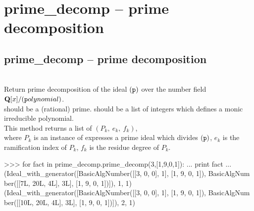 

 \section{prime\_decomp -- prime decomposition}
%
  \subsection{prime\_decomp -- prime decomposition}
   \\
   \spacing
   \quad Return prime decomposition of the ideal $({\texttt p})$ over the number field $\mathbf{Q}[x]/({\texttt polynomial})$.\\
   \spacing
   \quad {} should be a (rational) prime. 
    should be a list of integers which defines a monic irreducible polynomial.\\
   This method returns a list of $(P_k,\ e_k,\ f_k)$,\\ 
    where $P_k$ is an instance of  expresses a prime ideal which divides $({\texttt p})$, 
          $e_k$ is the ramification index of $P_k$, 
          $f_k$ is the residue degree of $P_k$.
%
\begin{ex}
>>> for fact in prime_decomp.prime_decomp(3,[1,9,0,1]):
...   print fact
...
(Ideal_with_generator([BasicAlgNumber([[3, 0, 0], 1], [1, 9, 0, 1]), BasicAlgNum
ber([[7L, 20L, 4L], 3L], [1, 9, 0, 1])]), 1, 1)
(Ideal_with_generator([BasicAlgNumber([[3, 0, 0], 1], [1, 9, 0, 1]), BasicAlgNum
ber([[10L, 20L, 4L], 3L], [1, 9, 0, 1])]), 2, 1)
\end{ex}%
\C




